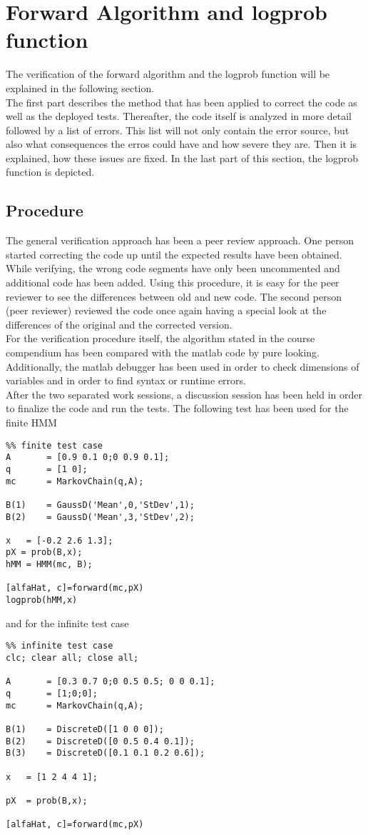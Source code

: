 \section{Forward Algorithm and logprob function}
The verification of the forward algorithm and the logprob function will be explained in the following section.\\
The first part describes the method that has been applied to correct the code as well as the deployed tests. Thereafter, the code itself is analyzed in more detail followed by a list of errors. This list will not only contain the error source, but also what consequences the erros could have and how severe they are. Then it is explained, how these issues are fixed. In the last part of this section, the logprob function is depicted.

\subsection{Procedure}
The general verification approach has been a peer review approach. One person started correcting the code up until the expected results have been obtained. While verifying, the wrong code segments have only been uncommented and additional code has been added. Using this procedure, it is easy for the peer reviewer to see the differences between old and new code. The second person (peer reviewer) reviewed the code once again having a special look at the differences of the original and the corrected version.\\
For the verification procedure itself, the algorithm stated in the course compendium has been compared with the matlab code by pure looking. Additionally, the matlab debugger has been used in order to check dimensions of variables and in order to find syntax or runtime errors.\\
After the two separated work sessions, a discussion session has been held in order to finalize the code and run the tests. The following test has been used for the finite HMM
\begin{lstlisting}
%% finite test case
A       = [0.9 0.1 0;0 0.9 0.1];
q       = [1 0];
mc      = MarkovChain(q,A);

B(1)    = GaussD('Mean',0,'StDev',1);
B(2)    = GaussD('Mean',3,'StDev',2);

x   = [-0.2 2.6 1.3];
pX = prob(B,x);
hMM = HMM(mc, B);

[alfaHat, c]=forward(mc,pX)
logprob(hMM,x)
\end{lstlisting}
and for the infinite test case
\begin{lstlisting}
%% infinite test case
clc; clear all; close all;

A       = [0.3 0.7 0;0 0.5 0.5; 0 0 0.1];
q       = [1;0;0];
mc      = MarkovChain(q,A);

B(1)    = DiscreteD([1 0 0 0]);
B(2)    = DiscreteD([0 0.5 0.4 0.1]);
B(3)    = DiscreteD([0.1 0.1 0.2 0.6]);

x   = [1 2 4 4 1];

pX  = prob(B,x);

[alfaHat, c]=forward(mc,pX)
\end{lstlisting}

